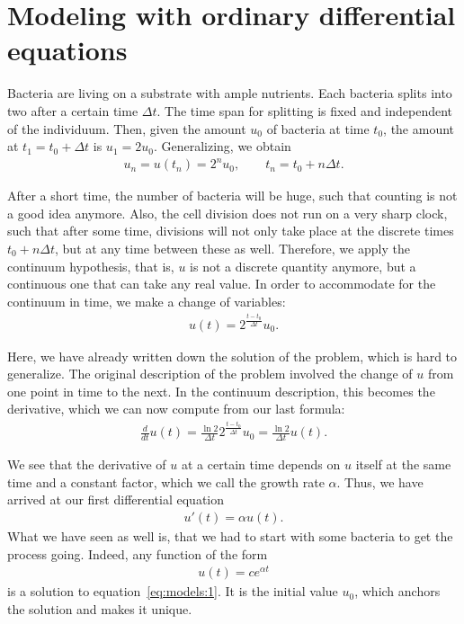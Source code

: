 \section{Modeling with ordinary differential equations}

\begin{example}
  Bacteria are living on a substrate with ample nutrients. Each
  bacteria splits into two after a certain time $\Delta t$. The time
  span for splitting is fixed and independent of the individuum. Then,
  given the amount $u_0$ of bacteria at time $t_0$, the amount at
  $t_1 = t_0+\Delta t$ is $u_1 = 2 u_0$. Generalizing, we obtain
  \begin{gather*}
    u_n = u(t_n) = 2^n u_0, \qquad t_n = t_0 + n\Delta t.
  \end{gather*}

  After a short time, the number of bacteria will be huge, such that
  counting is not a good idea anymore. Also, the cell division does
  not run on a very sharp clock, such that after some time, divisions
  will not only take place at the discrete times $t_0+n\Delta t$, but
  at any time between these as well. Therefore, we apply the continuum
  hypothesis, that is, $u$ is not a discrete quantity anymore, but a
  continuous one that can take any real value. In order to accommodate
  for the continuum in time, we make a change of variables:
  \begin{gather*}
    u(t) = 2^{\frac{t-t_0}{\Delta t}} u_0.
  \end{gather*}

  Here, we have already written down the solution of the problem,
  which is hard to generalize. The original description of the problem
  involved the change of $u$ from one point in time to the next. In
  the continuum description, this becomes the derivative, which we can
  now compute from our last formula:
  \begin{gather*}
    \tfrac{d}{dt} u(t) = \frac{\ln 2}{\Delta t} 2^{\frac{t-t_0}{\Delta t}} u_0
    = \frac{\ln 2}{\Delta t} u(t).
  \end{gather*}
  
  We see that the derivative of $u$ at a certain time depends on $u$
  itself at the same time and a constant factor, which we call the
  growth rate $\alpha$. Thus, we have arrived at our first
  differential equation
  \begin{gather}
    \label{eq:models:1}
    u'(t) = \alpha u(t).
  \end{gather}
  What we have seen as well is, that we had to start with some
  bacteria to get the process going. Indeed, any function of the form
  \begin{gather*}
    u(t) = c e^{\alpha t}
  \end{gather*}
  is a solution to equation~\eqref{eq:models:1}. It is the initial
  value $u_0$, which anchors the solution and makes it unique.
\end{example}


